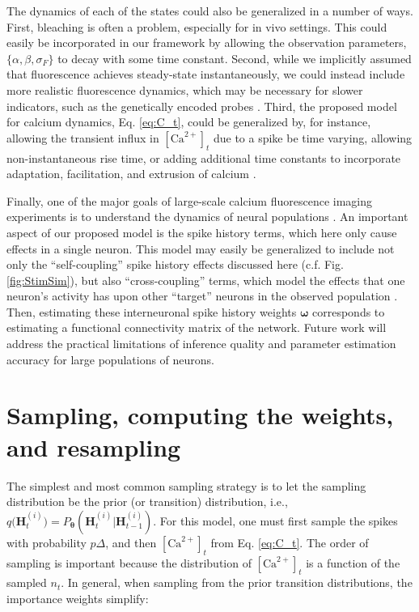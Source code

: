 \documentclass[12pt]{article}
\providecommand{\ve}[1]{\boldsymbol{#1}}
\providecommand{\ve}[1]{\boldsymbol{#1}}
\newcommand{\thetn}{\ve{\theta}}
\newcommand{\p}{P_{\thetn}}
\newcommand{\q}{q\big(\ve{H}_t^{(i)}\big)}
\newcommand{\Ca}{[\text{Ca}^{2+}]}
\begin{document}
The dynamics of each of the states could also be generalized in a number of ways. First, bleaching is often a problem, especially for in vivo settings.  This could easily be incorporated in our framework by allowing the observation parameters, $\{\alpha, \beta, \sigma_F\}$ to decay with some time constant. Second, while we implicitly assumed that fluorescence achieves steady-state instantaneously, we could instead include more realistic fluorescence dynamics, which may be necessary for slower indicators, such as the genetically encoded probes \cite{TayYue07}. Third, the proposed model for calcium dynamics, Eq. \ref{eq:C_t}, could be generalized by, for instance, allowing the transient influx in $\Ca_t$ due to a spike be time varying, allowing non-instantaneous rise time, or adding additional time constants to incorporate adaptation, facilitation, and extrusion of calcium \cite{TsienTsien90}.   

Finally, one of the major goals of large-scale calcium fluorescence imaging experiments is to understand the dynamics of neural populations  \cite{IkegayaYuste04}.  An important aspect of our proposed model is the spike history terms, which here only cause effects in a single neuron.  This model may easily be generalized to include not only the ``self-coupling'' spike history effects discussed here (c.f. Fig. \ref{fig:StimSim}), but also ``cross-coupling'' terms, which model the effects that one neuron's activity has upon other ``target'' neurons in the observed population \cite{Paninski04c, TruccoloBrown05, Pillow08}.  Then, estimating these interneuronal spike history weights $\ve{\omega}$ corresponds to estimating a functional connectivity matrix of the network.  Future work will address the practical limitations of inference quality and parameter estimation accuracy for large populations of neurons.

\newpage \appendix
{}
\section{Sampling, computing the weights, and resampling} \label{sec:cond_samp}

The simplest and most common sampling strategy is to let the sampling distribution be the prior (or transition) distribution, i.e., $\q=\p(\ve{H}_t^{(i)} | \ve{H}_{t-1}^{(i)})$. For this model, one must first sample the spikes with probability $p \Delta$, and then $\Ca_t$ from Eq. \ref{eq:C_t}.  The order of sampling is important because the distribution of $\Ca_t$ is a function of the sampled $n_t$.  In general, when sampling from the prior transition distributions, the importance weights simplify:
\end{document}
